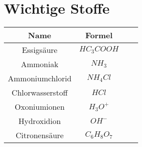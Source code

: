 
\section{Wichtige Stoffe} \label{sec:wichtige_stoffe}

\begin{table}[htbp]
    \centering
    \begin{tabular}{|Sc|Sc|}
        \hline
        \textbf{Name} & \textbf{Formel} \\
        \hline
        Essigsäure & $HC_3COOH$ \\
        \hline
        Ammoniak & $NH_3$ \\
        \hline
        Ammoniumchlorid & $NH_4Cl$ \\
        \hline
        Chlorwasserstoff & $HCl$ \\
        \hline
        Oxoniumionen & $H_3O^+$ \\
        \hline
        Hydroxidion & $OH^-$ \\
        \hline
        Citronensäure & $C_6H_8O_7$ \\
        \hline
    \end{tabular}
\end{table}

